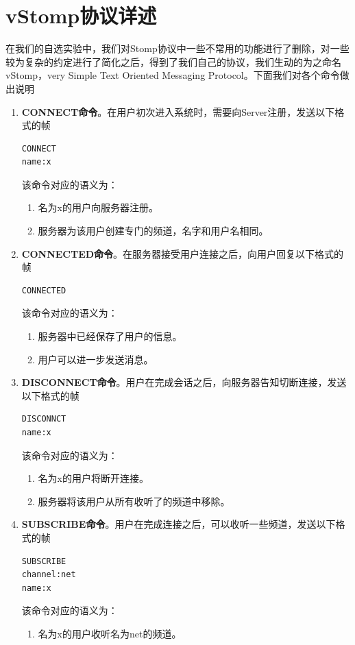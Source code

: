 \documentclass{ctexrep}
\begin{document}
	\section{vStomp协议详述}
	在我们的自选实验中，我们对Stomp协议中一些不常用的功能进行了删除，对一些较为复杂的约定进行了简化之后，得到了我们自己的协议，我们生动的为之命名vStomp，very Simple Text Oriented Messaging Protocol。下面我们对各个命令做出说明
	\begin{enumerate}
		\item \textbf{CONNECT命令}。在用户初次进入系统时，需要向Server注册，发送以下格式的帧\begin{lstlisting}
CONNECT
name:x

		\end{lstlisting}该命令对应的语义为：\begin{enumerate}
			\item 名为x的用户向服务器注册。
			\item 服务器为该用户创建专门的频道，名字和用户名相同。
		\end{enumerate}
	\item \textbf{CONNECTED命令}。在服务器接受用户连接之后，向用户回复以下格式的帧\begin{lstlisting}
CONNECTED
	\end{lstlisting}该命令对应的语义为：\begin{enumerate}
		\item 服务器中已经保存了用户的信息。
		\item 用户可以进一步发送消息。
	\end{enumerate}
		\item  \textbf{DISCONNECT命令}。用户在完成会话之后，向服务器告知切断连接，发送以下格式的帧\begin{lstlisting}
DISCONNCT
name:x
		\end{lstlisting}该命令对应的语义为：\begin{enumerate}
			\item 名为x的用户将断开连接。
			\item 服务器将该用户从所有收听了的频道中移除。
		\end{enumerate}
		\item \textbf{SUBSCRIBE命令}。用户在完成连接之后，可以收听一些频道，发送以下格式的帧\begin{lstlisting}
SUBSCRIBE
channel:net
name:x
		\end{lstlisting}该命令对应的语义为：\begin{enumerate}
			\item 名为x的用户收听名为net的频道。

\end{enumerate}
\end{enumerate}
\end{document}
